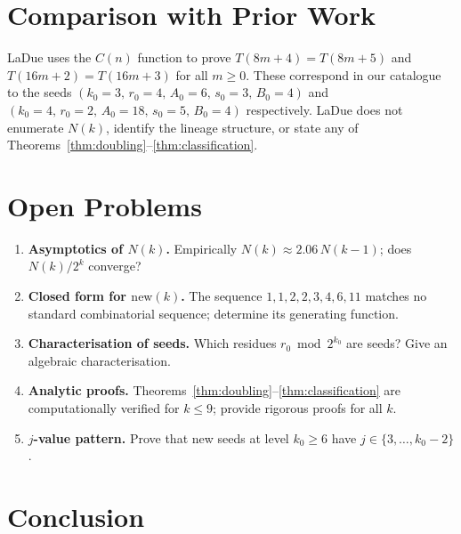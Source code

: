\documentclass[twocolumn,a4paper,10pt]{article}
\begin{document}
\section{Comparison with Prior Work}

LaDue \cite{ladue2017} uses the $C(n)$ function to prove
$T(8m+4) = T(8m+5)$ and $T(16m+2) = T(16m+3)$ for all $m \geq 0$.
These correspond in our catalogue to the seeds
$(k_0=3,\, r_0=4,\, A_0=6,\, s_0=3,\, B_0=4)$
and $(k_0=4,\, r_0=2,\, A_0=18,\, s_0=5,\, B_0=4)$ respectively.
LaDue does not enumerate $N(k)$, identify the lineage structure,
or state any of Theorems~\ref{thm:doubling}--\ref{thm:classification}.

\section{Open Problems}

\begin{enumerate}\itemsep0pt
  \item \textbf{Asymptotics of $N(k)$.}
        Empirically $N(k) \approx 2.06\, N(k-1)$; does $N(k)/2^k$ converge?
  \item \textbf{Closed form for $\mathrm{new}(k)$.}
        The sequence $1,1,2,2,3,4,6,11$ matches no standard combinatorial
        sequence; determine its generating function.
  \item \textbf{Characterisation of seeds.}
        Which residues $r_0 \bmod 2^{k_0}$ are seeds?
        Give an algebraic characterisation.
  \item \textbf{Analytic proofs.}
        Theorems~\ref{thm:doubling}--\ref{thm:classification} are
        computationally verified for $k \leq 9$;
        provide rigorous proofs for all $k$.
  \item \textbf{$j$-value pattern.}
        Prove that new seeds at level $k_0 \geq 6$ have
        $j \in \{3, \ldots, k_0 - 2\}$.
\end{enumerate}

\section{Conclusion}
\end{document}
